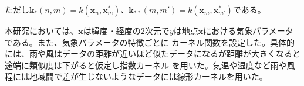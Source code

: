 ただし$\boldsymbol{k}_{*}(n, m) = k(\boldsymbol{x}_{n}, \boldsymbol{x}_{m}^*)$、$\boldsymbol{k}_{**}(m, m') = k(\boldsymbol{x}_{m}, \boldsymbol{x}_{m'}^*)$である。

本研究においては、$\boldsymbol{x}$は緯度・経度の2次元で$y$は地点$\boldsymbol{x}$における気象パラメータである。また、気象パラメータの特徴ごとに
カーネル関数を設定した。具体的には、雨や風はデータの距離が近いほど似たデータになるが距離が大きくなると途端に類似度は下がると仮定し指数カーネル
を用いた。気温や湿度など雨や風程には地域間で差が生じないようなデータには線形カーネルを用いた。
